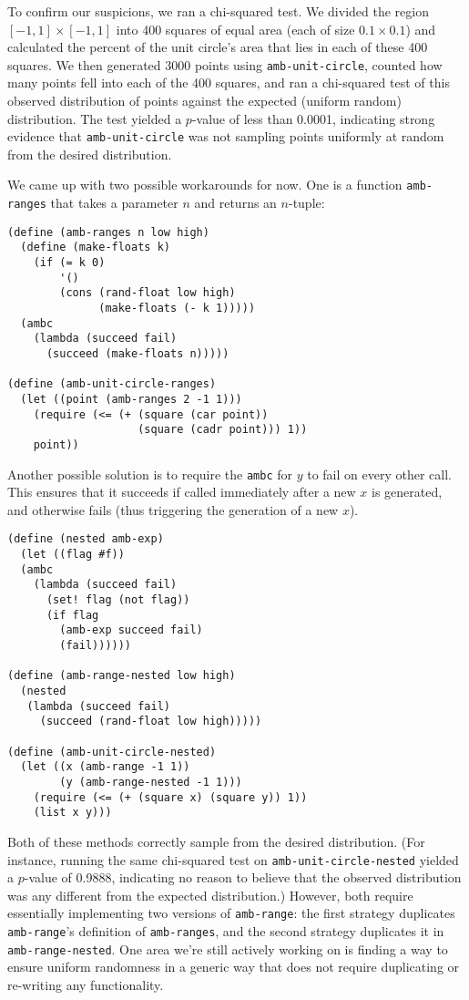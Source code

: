 \documentclass{article}
\begin{document}
To confirm our suspicions, we ran a chi-squared test. We divided the
region $[-1,1]\times[-1,1]$ into 400 squares of equal area (each of
size $0.1\times 0.1$) and calculated the percent of the unit circle's
area that lies in each of these 400 squares. We then generated 3000
points using \texttt{amb-unit-circle}, counted how many points fell
into each of the 400 squares, and ran a chi-squared test of this
observed distribution of points against the expected (uniform random)
distribution. The test yielded a $p$-value of less than 0.0001,
indicating strong evidence that \texttt{amb-unit-circle} was not
sampling points uniformly at random from the desired distribution.

We came up with two possible workarounds for now. One is a function
\texttt{amb-ranges} that takes a parameter $n$ and returns an $n$-tuple:
\begin{lstlisting}
(define (amb-ranges n low high)
  (define (make-floats k)
    (if (= k 0)
        '()
        (cons (rand-float low high)
              (make-floats (- k 1)))))
  (ambc
    (lambda (succeed fail)
      (succeed (make-floats n)))))

(define (amb-unit-circle-ranges)
  (let ((point (amb-ranges 2 -1 1)))
    (require (<= (+ (square (car point))
                    (square (cadr point))) 1))
    point))
\end{lstlisting}

Another possible solution is to require the \texttt{ambc} for $y$ to fail on
every other call. This ensures that it succeeds if called immediately after a
new $x$ is generated, and otherwise fails (thus triggering the generation of a
new $x$).
\begin{lstlisting}
(define (nested amb-exp)
  (let ((flag #f))
  (ambc
    (lambda (succeed fail)
      (set! flag (not flag))
      (if flag
        (amb-exp succeed fail)
        (fail))))))

(define (amb-range-nested low high)
  (nested
   (lambda (succeed fail)
     (succeed (rand-float low high)))))

(define (amb-unit-circle-nested)
  (let ((x (amb-range -1 1))
        (y (amb-range-nested -1 1)))
    (require (<= (+ (square x) (square y)) 1))
    (list x y)))
\end{lstlisting}

Both of these methods correctly sample from the desired
distribution. (For instance, running the same chi-squared test on
\texttt{amb-unit-circle-nested} yielded a $p$-value of 0.9888,
indicating no reason to believe that the observed distribution was any
different from the expected distribution.)  However, both require
essentially implementing two versions of \texttt{amb-range}: the first
strategy duplicates \texttt{amb-range}'s definition of
\texttt{amb-ranges}, and the second strategy duplicates it in
\texttt{amb-range-nested}. One area we're still actively working on is
finding a way to ensure uniform randomness in a generic way that does
not require duplicating or re-writing any functionality.
\end{document}
